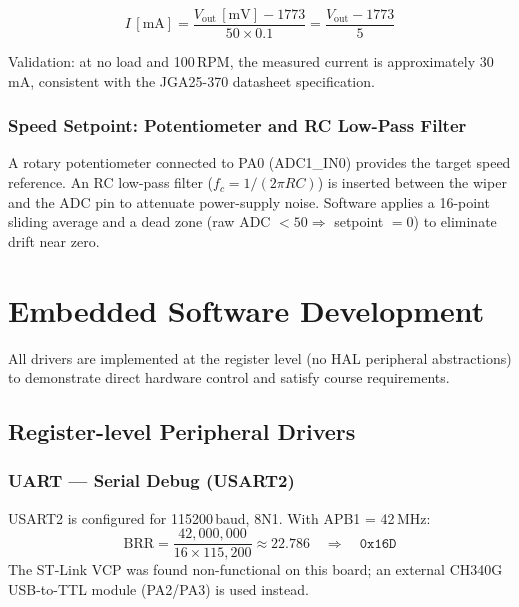 \documentclass[12pt, a4paper]{report}
\begin{document}
\begin{equation}
    I\,[\text{mA}] = \frac{V_{\text{out}}\,[\text{mV}] - 1773}
                         {50 \times 0.1}
                  = \frac{V_{\text{out}} - 1773}{5}
    \label{eq:current}
\end{equation}

Validation: at no load and 100\,RPM, the measured current is approximately
30\,mA, consistent with the JGA25-370 datasheet specification.

\subsection{Speed Setpoint: Potentiometer and RC Low-Pass Filter}

A rotary potentiometer connected to PA0 (ADC1\_IN0) provides the target
speed reference. An RC low-pass filter ($f_c = 1/(2\pi RC)$) is inserted
between the wiper and the ADC pin to attenuate power-supply noise. Software
applies a 16-point sliding average and a dead zone (raw ADC $< 50
\Rightarrow$ setpoint $= 0$) to eliminate drift near zero.

\chapter{Embedded Software Development}

All drivers are implemented at the register level (no HAL peripheral
abstractions) to demonstrate direct hardware control and satisfy course
requirements.

\section{Register-level Peripheral Drivers}

\subsection{UART — Serial Debug (USART2)}

USART2 is configured for 115200\,baud, 8N1. With APB1 = 42\,MHz:
\begin{equation}
    \text{BRR} = \frac{42{,}000{,}000}{16 \times 115{,}200} \approx 22.786
    \quad\Rightarrow\quad \texttt{0x16D}
\end{equation}
The ST-Link VCP was found non-functional on this board; an external CH340G
USB-to-TTL module (PA2/PA3) is used instead.
\end{document}
